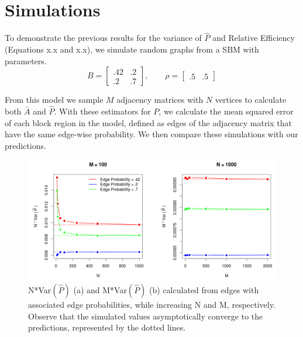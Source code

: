 	\section{Simulations}
	To demonstrate the previous results for the variance of $\hat{P}$ and Relative Efficiency (Equations x.x and x.x), we simulate random graphs from a SBM with parameters.
	\begin{equation*}
	B = \begin{bmatrix}
	.42 & .2 \\
	.2 & .7 
	\end{bmatrix}
	,\qquad \rho = \begin{bmatrix}
	.5 & .5
	\end{bmatrix}
	\end{equation*}
	
	From this model we sample $M$ adjacency matrices with $N$ vertices to calculate both $\bar{A}$ and $\hat{P}$.  With these estimators for $P$, we calculate the mean squared error of each block region in the model, defined as edges of the adjacency matrix that have the same edge-wise probability.  We then compare these simulations with our predictions.
	
	\begin{figure}[!htb]
		\centering
		\includegraphics[width=16cm]{VarNM_rho.PNG}
		\caption{N*Var$(\hat{P})$ (a) and  M*Var$(\hat{P})$ (b) calculated from edges with associated edge probabilities, while increasing N and M, respectively.  Observe that the simulated values asymptotically converge to the predictions, represented by the dotted lines.}
		\label{fig:plot1}
	\end{figure}
	
